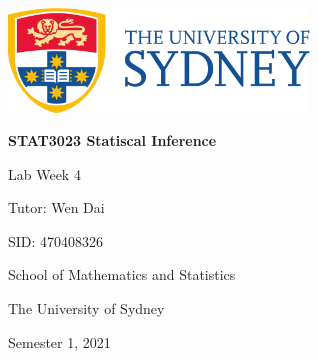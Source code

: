 \includegraphics[width=8cm]{./UsydLogo}

\vspace{1cm}


\horline
{\centering\bfseries \Large \textsc{STAT3023} Statiscal Inference

}
\horline

\vspace{3cm}

{\large \centering Lab Week 4

}

{\centering

\vspace{1cm}

Tutor: Wen Dai

SID: 470408326

\vspace{1cm}

School of Mathematics and Statistics

The University of Sydney

\vfill

Semester 1, 2021\newpage

}
